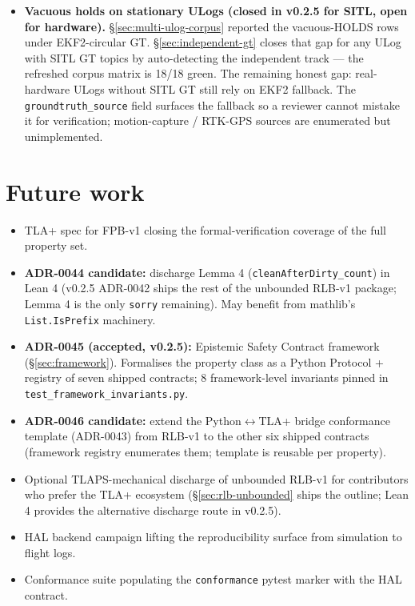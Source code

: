 \documentclass[acmsmall,nonacm=true,review=false]{acmart}
\theoremstyle{plain}
\begin{document}
\begin{itemize}
        (\S\ref{sec:properties}). The remaining honest gap:
        FPB-v2 does not validate the iid Bernoulli assumption
        Clopper-Pearson invokes, does not adjust for
        multiple-testing across parameter sweeps, and reports
        only a one-sided bound. Wilson-score and two-sided
        variants are deferred amendments.
  \item \textbf{Vacuous holds on stationary ULogs (closed in
        v0.2.5 for SITL, open for hardware).}
        \S\ref{sec:multi-ulog-corpus} reported the vacuous-HOLDS
        rows under EKF2-circular GT.
        \S\ref{sec:independent-gt} closes that gap for any ULog
        with SITL GT topics by auto-detecting the independent
        track --- the refreshed corpus matrix is 18/18 green.
        The remaining honest gap: real-hardware ULogs without
        SITL GT still rely on EKF2 fallback. The
        \texttt{groundtruth\_source} field surfaces the fallback
        so a reviewer cannot mistake it for verification;
        motion-capture / RTK-GPS sources are enumerated but
        unimplemented.
\end{itemize}

\section{Future work}

\begin{itemize}
  \item TLA+ spec for FPB-v1 closing the formal-verification
        coverage of the full property set.
  \item \textbf{ADR-0044 candidate:} discharge Lemma 4
        (\texttt{cleanAfterDirty\_count}) in Lean 4 (v0.2.5
        ADR-0042 ships the rest of the unbounded RLB-v1
        package; Lemma 4 is the only \texttt{sorry} remaining).
        May benefit from mathlib's \texttt{List.IsPrefix}
        machinery.
  \item \textbf{ADR-0045 (accepted, v0.2.5):} Epistemic Safety
        Contract framework (\S\ref{sec:framework}). Formalises
        the property class as a Python Protocol + registry of
        seven shipped contracts; 8 framework-level invariants
        pinned in \texttt{test\_framework\_invariants.py}.
  \item \textbf{ADR-0046 candidate:} extend the Python$\leftrightarrow$TLA+
        bridge conformance template (ADR-0043) from RLB-v1 to
        the other six shipped contracts (framework registry
        enumerates them; template is reusable per property).
  \item Optional TLAPS-mechanical discharge of unbounded RLB-v1
        for contributors who prefer the TLA+ ecosystem
        (\S\ref{sec:rlb-unbounded} ships the outline; Lean 4
        provides the alternative discharge route in v0.2.5).
  \item HAL backend campaign lifting the reproducibility surface
        from simulation to flight logs.
  \item Conformance suite populating the \texttt{conformance}
        pytest marker with the HAL contract.
\end{itemize}
\end{document}
